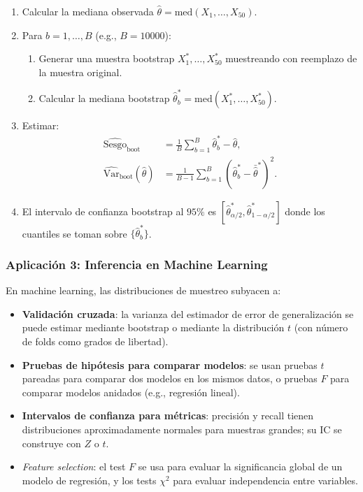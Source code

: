 \begin{solucion}
\begin{enumerate}
 \item Calcular la mediana observada $\hat{\theta} = \text{med}(X_1, \ldots, X_{50})$.
 \item Para $b = 1, \ldots, B$ (e.g., $B = 10000$):
   \begin{enumerate}
    \item Generar una muestra bootstrap $X_1^*, \ldots, X_{50}^*$ muestreando con
    reemplazo de la muestra original.
    \item Calcular la mediana bootstrap $\hat{\theta}_b^* = \text{med}(X_1^*, \ldots, X_{50}^*)$.
   \end{enumerate}
 \item Estimar:
   \begin{align}
    \widehat{\text{Sesgo}}_{\text{boot}} &= \frac{1}{B}\sum_{b=1}^B \hat{\theta}_b^* - \hat{\theta}, \\
    \widehat{\text{Var}}_{\text{boot}}(\hat{\theta}) &= \frac{1}{B-1}\sum_{b=1}^B (\hat{\theta}_b^* - \bar{\hat{\theta}}^*)^2.
   \end{align}
 \item El intervalo de confianza bootstrap al $95\%$ es
 $[\hat{\theta}_{\alpha/2}^*, \hat{\theta}_{1-\alpha/2}^*]$ donde los cuantiles
 se toman sobre $\{\hat{\theta}_b^*\}$.
\end{enumerate}
\end{solucion}



\subsubsection{Aplicaci\'on 3: Inferencia en Machine Learning}

En machine learning, las distribuciones de muestreo subyacen a:

\begin{itemize}
 \item \textbf{Validaci\'on cruzada}: la varianza del estimador de error de
 generalizaci\'on se puede estimar mediante bootstrap o mediante la distribuci\'on
 $t$ (con n\'umero de folds como grados de libertad).
 \item \textbf{Pruebas de hip\'otesis para comparar modelos}: se usan pruebas
 $t$ pareadas para comparar dos modelos en los mismos datos, o pruebas $F$ para
 comparar modelos anidados (e.g., regresi\'on lineal).
 \item \textbf{Intervalos de confianza para m\'etricas}: precisi\'on y recall
 tienen distribuciones aproximadamente normales para muestras grandes; su IC
 se construye con $Z$ o $t$.
 \item \emph{Feature selection}: el test $F$ se usa para evaluar la significancia
 global de un modelo de regresi\'on, y los tests $\chi^2$ para evaluar
 independencia entre variables.
\end{itemize}

